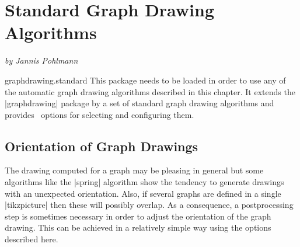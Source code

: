 %
%
%

\section{Standard Graph Drawing Algorithms}
\label{section-library-graphdrawing-standard}

{\emph{by Jannis Pohlmann}}

\begin{tikzlibrary}{graphdrawing.standard}
  This package needs to be loaded in order to use any of the automatic
  graph drawing algorithms described in this chapter. It extends the
  |graphdrawing| package by a set of standard graph drawing 
  algorithms and provides \tikzname\ options for selecting and 
  configuring them.
\end{tikzlibrary}

\subsection{Orientation of Graph Drawings}
\label{subsection-library-graphdrawing-standard-orientation}

The drawing computed for a graph may be pleasing in general but some
algorithms like the |spring| algorithm show the tendency to generate
drawings with an unexpected orientation. Also, if several graphs are 
defined in a single |{tikzpicture}| then these will possibly overlap.
As a consequence, a postprocessing step is sometimes necessary in order
to adjust the orientation of the graph drawing. This can be achieved in
a relatively simple way using the options described here.

